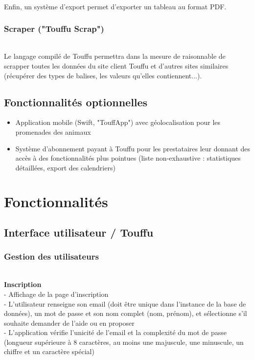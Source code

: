 \documentclass[conference]{IEEEtran}
\begin{document}
Enfin, un système d'export permet d'exporter un tableau au format PDF.\\

\subsubsection{Scraper ("Touffu Scrap")}\hfill\\

Le langage compilé de Touffu permettra dans la mesure de raisonnable de scrapper toutes les données du site client Touffu et d'autres sites similaires (récupérer des types de balises, les valeurs qu'elles contiennent...).

\subsection{Fonctionnalités optionnelles}
\begin{itemize}
	\item Application mobile (Swift, "TouffApp") avec géolocalisation pour les promenades des animaux
	\item Système d'abonnement payant à Touffu pour les prestataires leur donnant des accès à des fonctionnalités plus pointues (liste non-exhaustive : statistiques détaillées, export des calendriers)
\end{itemize}


\section{Fonctionnalités}

\subsection{Interface utilisateur / Touffu}

\subsubsection{Gestion des utilisateurs}\hfil\\

\textbf{Inscription}\\
- Affichage de la page d'inscription\\
- L'utilisateur renseigne son email (doit être unique dans l'instance de la base de données), un mot de passe et son nom complet (nom, prénom), et sélectionne s'il souhaite demander de l'aide ou en proposer\\
- L'application vérifie l'unicité de l'email et la complexité du mot de passe (longueur supérieure à 8 caractères, au moins une majuscule, une minuscule, un chiffre et un caractère spécial)\\
\end{document}
